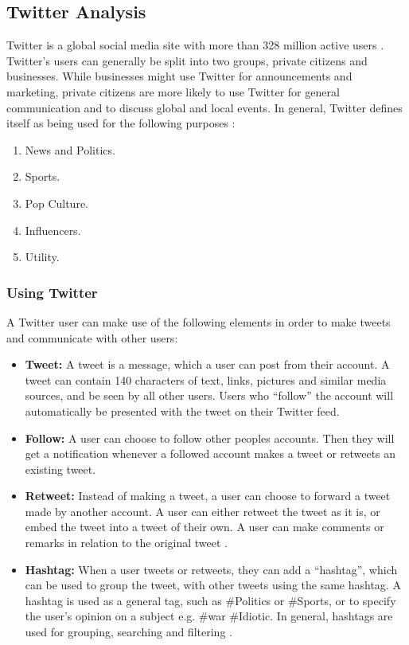 \subsection{Twitter Analysis}\label{sec:twitter-analysis}
Twitter is a global social media site with more than 328 million active users
\citep{SocialMediaStats}. Twitter's users
can generally be split into two groups, private citizens and businesses. While businesses might use Twitter for
announcements and marketing, private citizens are more likely to use Twitter for
general communication and to discuss global and local events. In general,
Twitter defines itself as being used for the following purposes
\citep{StartingTwitter}:

\begin{enumerate}    
  \item News and Politics.
  \item Sports.
  \item Pop Culture. 
  \item Influencers.
  \item Utility.
\end{enumerate} %

\subsubsection{Using Twitter}
A Twitter user can make use of the following elements \citep{StartingTwitter}
in order to make tweets and communicate with other users:

\begin{itemize}
  \item \textbf{Tweet:} A tweet is a message, which a user can post from their
  account. A tweet can contain 140 characters \citep{StartingTwitter2}
   of text, links, pictures and
  similar media sources, and be seen by all other users. Users who ``follow''
  the account will automatically be presented with the tweet on their Twitter
  feed.
  \item \textbf{Follow:} A user can choose to follow other peoples accounts.
  Then they will get a notification whenever a followed account makes a tweet
  or retweets an existing tweet.
  \item \textbf{Retweet:} Instead of making a tweet, a user can choose to
  forward a tweet made by another account. A user can either retweet the tweet
  as it is, or embed the tweet into a tweet of their own. A user can make
  comments or remarks in relation to the original tweet .
  \item \textbf{Hashtag:} When a user tweets or retweets, they can add a
  ``hashtag'', which can be used to group the tweet, with other tweets using
  the same hashtag. A hashtag is used as a general tag, such as \#Politics or
  \#Sports, or to specify the user's opinion on a subject e.g. \#war \#Idiotic.
  In general, hashtags are used for grouping, searching and filtering 
  .
\end{itemize}

